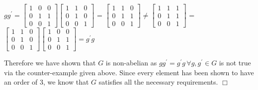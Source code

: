 \documentclass[12pt,letterpaper,reqno]{amsart}
\begin{document}
\begin{enumerate}
\begin{flushleft}
$gg^\prime = \begin{bmatrix} 1 & 0 & 0 \\0 & 1 & 1\\ 0 & 0 & 1 \end{bmatrix}\begin{bmatrix} 1 & 1 & 0 \\0 & 1 & 0\\ 0 & 0 & 1 \end{bmatrix}$ = $\begin{bmatrix} 1 & 1 & 0 \\0 & 1 & 1\\ 0 & 0 & 1 \end{bmatrix} \not= \begin{bmatrix} 1 & 1 & 1 \\0 & 1 & 1\\ 0 & 0 & 1 \end{bmatrix}$ = $\begin{bmatrix} 1 & 1 & 0 \\0 & 1 & 0\\ 0 & 0 & 1 \end{bmatrix}\begin{bmatrix} 1 & 0 & 0 \\0 & 1 & 1\\ 0 & 0 & 1 \end{bmatrix} = g^\prime g$
\newline
\newline

Therefore we have shown that $G$ is non-abelian as $gg^\prime = g^\prime g \, \forall g, g^\prime \in G$ is not true via the counter-example given above. Since every element has been shown to have an order of 3, we know that $G$ satisfies all the necessary requirements. $\Box$
\end{flushleft}

\end{enumerate}
\end{document}
